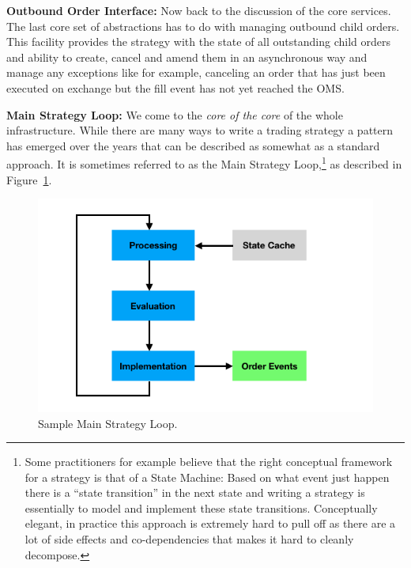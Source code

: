 \noindent\textbf{Outbound Order Interface:} Now back to the discussion of the core services. The last core set of abstractions has to do with managing outbound child orders. This facility provides the strategy with the state of all outstanding child orders and ability to create, cancel and amend them in an asynchronous way and manage any exceptions like for example, canceling an order that has just been executed on exchange but the fill event has not yet reached the OMS. \twomedskip


\noindent\textbf{Main Strategy Loop:} We come to the \emph{core of the core} of the whole infrastructure. While there are many ways to write a trading strategy a pattern has emerged over the years that can be described as somewhat as a standard approach. It is sometimes referred to as the Main Strategy Loop,\footnote{Some practitioners for example believe that the right conceptual framework for a strategy is that of a State Machine: Based on what event just happen there is a ``state transition'' in the next state and writing a strategy is essentially to model and implement these state transitions. Conceptually elegant, in practice this approach is extremely hard to pull off as there are a lot of side effects and co-dependencies that makes it hard to cleanly decompose.} as described in Figure~\ref{fig:MainLoop}. 

	\begin{figure}[!ht]
	\centering
	\includegraphics[width=\textwidth]{chapters/chapter_tech/figures/MainLoop.png} 
	\caption{Sample Main Strategy Loop.\label{fig:MainLoop}}
	\end{figure}
	
